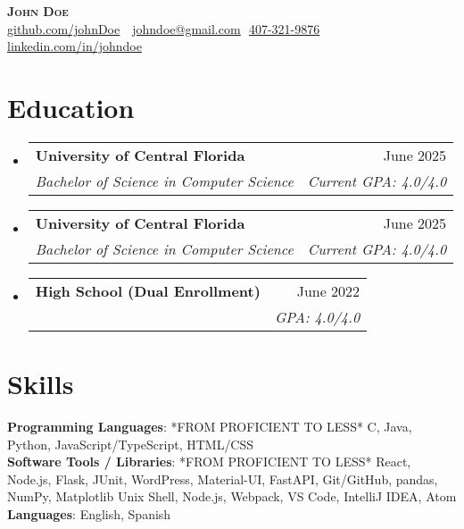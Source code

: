\documentclass[letterpaper,11pt]{article}
\makeatletter
\newcommand{\resumeSubheading}[4]{
  \vspace{-2pt}\item
    \begin{tabular*}{0.97\textwidth}[t]{l@{\extracolsep{\fill}}r}
      \textbf{#1} & #2 \\
      \textit{\small#3} & \textit{\small #4} \\
    \end{tabular*}\vspace{-7pt}
}
\newcommand{\resumeSubHeadingListStart}{\begin{itemize}[leftmargin=0.15in, label={}]}
\newcommand{\resumeSubHeadingListEnd}{\end{itemize}}
\makeatother
\begin{document}
\begin{flushright}
  \vspace{-4pt}
\end{flushright}

\vspace{-7pt}

\begin{center}
    \textbf{\Huge \scshape John Doe} \\ \vspace{8pt}
    \small 
    \faGithub
    \href{https://github.com/johnDoe}{\underline{github.com/johnDoe}} $  $
    \faEnvelope$  $
    \href{mailto:johndoe@gmail.com}
    {\underline{johndoe@gmail.com}}
    \faPhone$  $
    \underline{407-321-9876}
    \faLinkedin$  $
    \href{https://linkedin.com/in/johndoe}{\underline{linkedin.com/in/johndoe}} $  $
\end{center}

\section{Education}
  \resumeSubHeadingListStart
    \resumeSubheading
        {University of Central Florida}{June 2025}
        {Bachelor of Science in Computer Science}{Current GPA: 4.0/4.0}
  
    \resumeSubheading
      {University of Central Florida}{June 2025}
      {Bachelor of Science in Computer Science}{Current GPA: 4.0/4.0}
      
    \resumeSubheading
      {High School \footnotesize{(Dual Enrollment)}}{June 2022}
      {}{GPA: 4.0/4.0}

  \resumeSubHeadingListEnd

\section{Skills}
 \begin{itemize}[leftmargin=0.15in, label={}]
    \small{\item{
    
     \textbf{Programming Languages}{: *FROM PROFICIENT TO LESS* C, Java, Python, JavaScript/TypeScript, HTML/CSS} \\
     
     \textbf{Software Tools / Libraries}{: *FROM PROFICIENT TO LESS* React, Node.js, Flask, JUnit, WordPress, Material-UI, FastAPI, Git/GitHub, pandas, NumPy, Matplotlib Unix Shell, Node.js, Webpack, VS Code, IntelliJ IDEA, Atom} \\

     \textbf{Languages}{: English, Spanish} \\
     
    }}
 \end{itemize}
\end{document}
